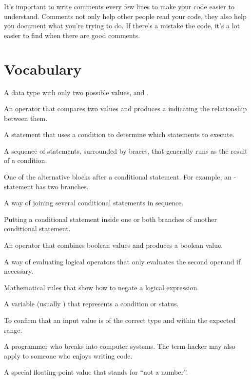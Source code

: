 
It's important to write comments every few lines to make your code easier to understand.
Comments not only help other people read your code, they also help you document what you're trying to do.
If there's a mistake the code, it's a lot easier to find when there are good comments.


\section{Vocabulary}

\begin{description}

A data type with only two possible values,  and .

An operator that compares two values and produces a  indicating the relationship between them.

A statement that uses a condition to determine which statements to execute.

A sequence of statements, surrounded by braces, that generally runs as the result of a condition.

One of the alternative blocks after a conditional statement.
For example, an - statement has two branches.

A way of joining several conditional statements in sequence.

Putting a conditional statement inside one or both branches of another conditional statement.

An operator that combines boolean values and produces a boolean value.

A way of evaluating logical operators that only evaluates the second operand if necessary.

Mathematical rules that show how to negate a logical expression.

A variable (usually ) that represents a condition or status.

To confirm that an input value is of the correct type and within the expected range.

A programmer who breaks into computer systems.
The term hacker may also apply to someone who enjoys writing code.

A special floating-point value that stands for ``not a number''.

\end{description}


